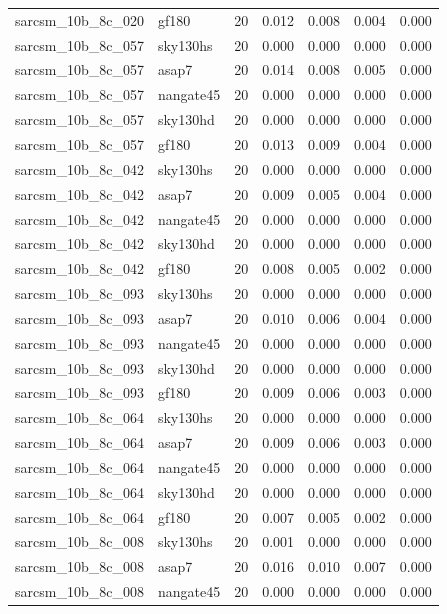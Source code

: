 \begin{tabular}{llrrrrr}
sarcsm\_10b\_8c\_020 & gf180 & 20 & 0.012 & 0.008 & 0.004 & 0.000 \\
sarcsm\_10b\_8c\_057 & sky130hs & 20 & 0.000 & 0.000 & 0.000 & 0.000 \\
sarcsm\_10b\_8c\_057 & asap7 & 20 & 0.014 & 0.008 & 0.005 & 0.000 \\
sarcsm\_10b\_8c\_057 & nangate45 & 20 & 0.000 & 0.000 & 0.000 & 0.000 \\
sarcsm\_10b\_8c\_057 & sky130hd & 20 & 0.000 & 0.000 & 0.000 & 0.000 \\
sarcsm\_10b\_8c\_057 & gf180 & 20 & 0.013 & 0.009 & 0.004 & 0.000 \\
sarcsm\_10b\_8c\_042 & sky130hs & 20 & 0.000 & 0.000 & 0.000 & 0.000 \\
sarcsm\_10b\_8c\_042 & asap7 & 20 & 0.009 & 0.005 & 0.004 & 0.000 \\
sarcsm\_10b\_8c\_042 & nangate45 & 20 & 0.000 & 0.000 & 0.000 & 0.000 \\
sarcsm\_10b\_8c\_042 & sky130hd & 20 & 0.000 & 0.000 & 0.000 & 0.000 \\
sarcsm\_10b\_8c\_042 & gf180 & 20 & 0.008 & 0.005 & 0.002 & 0.000 \\
sarcsm\_10b\_8c\_093 & sky130hs & 20 & 0.000 & 0.000 & 0.000 & 0.000 \\
sarcsm\_10b\_8c\_093 & asap7 & 20 & 0.010 & 0.006 & 0.004 & 0.000 \\
sarcsm\_10b\_8c\_093 & nangate45 & 20 & 0.000 & 0.000 & 0.000 & 0.000 \\
sarcsm\_10b\_8c\_093 & sky130hd & 20 & 0.000 & 0.000 & 0.000 & 0.000 \\
sarcsm\_10b\_8c\_093 & gf180 & 20 & 0.009 & 0.006 & 0.003 & 0.000 \\
sarcsm\_10b\_8c\_064 & sky130hs & 20 & 0.000 & 0.000 & 0.000 & 0.000 \\
sarcsm\_10b\_8c\_064 & asap7 & 20 & 0.009 & 0.006 & 0.003 & 0.000 \\
sarcsm\_10b\_8c\_064 & nangate45 & 20 & 0.000 & 0.000 & 0.000 & 0.000 \\
sarcsm\_10b\_8c\_064 & sky130hd & 20 & 0.000 & 0.000 & 0.000 & 0.000 \\
sarcsm\_10b\_8c\_064 & gf180 & 20 & 0.007 & 0.005 & 0.002 & 0.000 \\
sarcsm\_10b\_8c\_008 & sky130hs & 20 & 0.001 & 0.000 & 0.000 & 0.000 \\
sarcsm\_10b\_8c\_008 & asap7 & 20 & 0.016 & 0.010 & 0.007 & 0.000 \\
sarcsm\_10b\_8c\_008 & nangate45 & 20 & 0.000 & 0.000 & 0.000 & 0.000 \\

\end{tabular}
